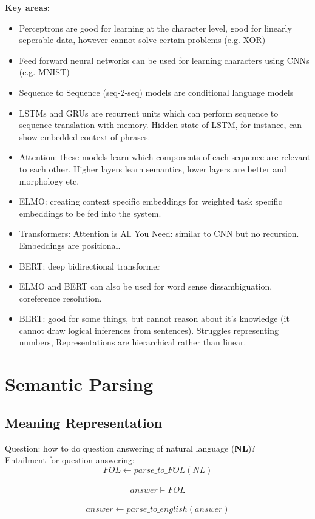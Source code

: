 \documentclass[]{article}
\begin{document}
	\textbf{Key areas:}
	\begin{itemize}
	 \item Perceptrons are good for learning at the character level, good for linearly seperable data, however cannot solve certain problems (e.g. XOR)
	 \item Feed forward neural networks can be used for learning characters using CNNs (e.g. MNIST)
	 \item Sequence to Sequence (seq-2-seq) models are conditional language models
	 \item LSTMs and GRUs are recurrent units which can perform sequence to sequence translation with memory. Hidden state of LSTM, for instance, can show embedded context of phrases.
	 \item Attention: these models learn which components of each sequence are relevant to each other. Higher layers learn semantics, lower layers are better and morphology etc.
	 \item ELMO: creating context specific embeddings for weighted task specific embeddings to be fed into the system. 
	 \item Transformers: Attention is All You Need: similar to CNN but no recursion. Embeddings are positional. 
	 \item BERT: deep bidirectional transformer
	 \item ELMO and BERT can also be used for word sense dissambiguation, coreference resolution.
	 \item BERT: good for some things, but cannot reason about it's knowledge (it cannot draw logical inferences from sentences). Struggles representing numbers, Representations are hierarchical rather than linear.
	\end{itemize}

	
	\clearpage 
	\section{Semantic Parsing}
	
	\subsection{Meaning Representation}
	Question: how to do question answering of natural language (\textbf{NL})? \\
	Entailment for question answering: $$FOL \gets parse\_to\_FOL(NL) $$ \\
              $$ answer \models FOL $$ \\
              $$ answer \gets parse\_to\_english(answer) $$ \\
              
\end{document}
